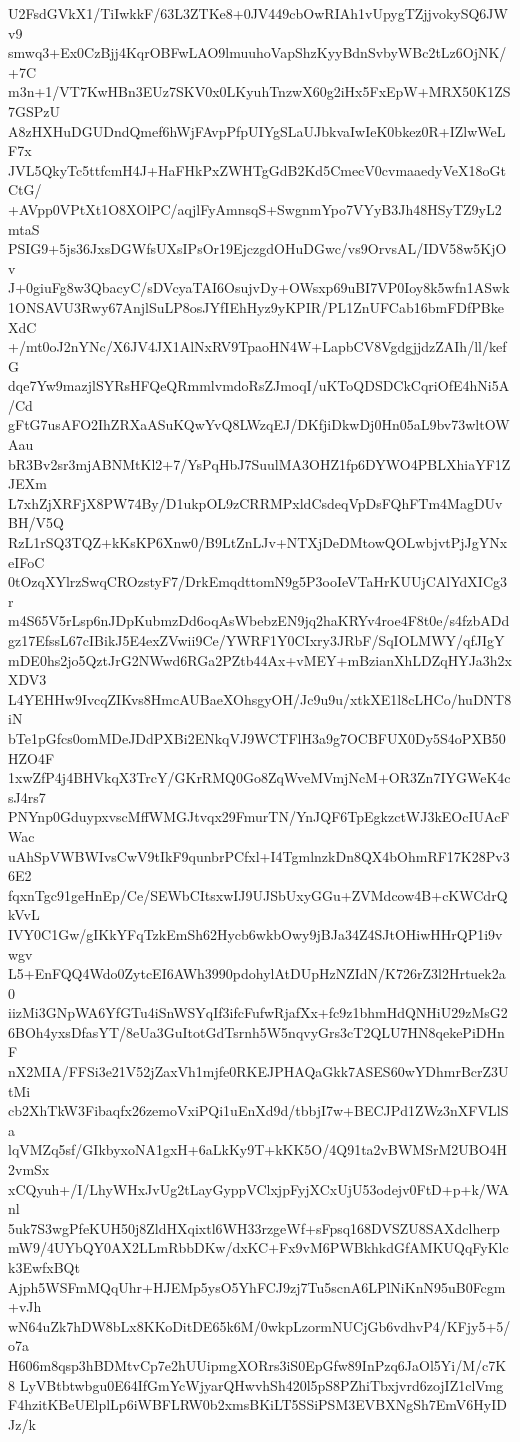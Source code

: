 U2FsdGVkX1/TiIwkkF/63L3ZTKe8+0JV449cbOwRIAh1vUpygTZjjvokySQ6JWv9
smwq3+Ex0CzBjj4KqrOBFwLAO9lmuuhoVapShzKyyBdnSvbyWBc2tLz6OjNK/+7C
m3n+1/VT7KwHBn3EUz7SKV0x0LKyuhTnzwX60g2iHx5FxEpW+MRX50K1ZS7GSPzU
A8zHXHuDGUDndQmef6hWjFAvpPfpUIYgSLaUJbkvaIwIeK0bkez0R+IZlwWeLF7x
JVL5QkyTc5ttfcmH4J+HaFHkPxZWHTgGdB2Kd5CmecV0cvmaaedyVeX18oGtCtG/
+AVpp0VPtXt1O8XOlPC/aqjlFyAmnsqS+SwgnmYpo7VYyB3Jh48HSyTZ9yL2mtaS
PSIG9+5js36JxsDGWfsUXsIPsOr19EjczgdOHuDGwc/vs9OrvsAL/IDV58w5KjOv
J+0giuFg8w3QbacyC/sDVcyaTAI6OsujvDy+OWsxp69uBI7VP0Ioy8k5wfn1ASwk
1ONSAVU3Rwy67AnjlSuLP8osJYfIEhHyz9yKPIR/PL1ZnUFCab16bmFDfPBkeXdC
+/mt0oJ2nYNc/X6JV4JX1AlNxRV9TpaoHN4W+LapbCV8VgdgjjdzZAIh/ll/kefG
dqe7Yw9mazjlSYRsHFQeQRmmlvmdoRsZJmoqI/uKToQDSDCkCqriOfE4hNi5A/Cd
gFtG7usAFO2IhZRXaASuKQwYvQ8LWzqEJ/DKfjiDkwDj0Hn05aL9bv73wltOWAau
bR3Bv2sr3mjABNMtKl2+7/YsPqHbJ7SuulMA3OHZ1fp6DYWO4PBLXhiaYF1ZJEXm
L7xhZjXRFjX8PW74By/D1ukpOL9zCRRMPxldCsdeqVpDsFQhFTm4MagDUvBH/V5Q
RzL1rSQ3TQZ+kKsKP6Xnw0/B9LtZnLJv+NTXjDeDMtowQOLwbjvtPjJgYNxeIFoC
0tOzqXYlrzSwqCROzstyF7/DrkEmqdttomN9g5P3ooIeVTaHrKUUjCAlYdXICg3r
m4S65V5rLsp6nJDpKubmzDd6oqAsWbebzEN9jq2haKRYv4roe4F8t0e/s4fzbADd
gz17EfssL67cIBikJ5E4exZVwii9Ce/YWRF1Y0CIxry3JRbF/SqIOLMWY/qfJIgY
mDE0hs2jo5QztJrG2NWwd6RGa2PZtb44Ax+vMEY+mBzianXhLDZqHYJa3h2xXDV3
L4YEHHw9IvcqZIKvs8HmcAUBaeXOhsgyOH/Jc9u9u/xtkXE1l8cLHCo/huDNT8iN
bTe1pGfcs0omMDeJDdPXBi2ENkqVJ9WCTFlH3a9g7OCBFUX0Dy5S4oPXB50HZO4F
1xwZfP4j4BHVkqX3TrcY/GKrRMQ0Go8ZqWveMVmjNcM+OR3Zn7IYGWeK4csJ4rs7
PNYnp0GduypxvscMffWMGJtvqx29FmurTN/YnJQF6TpEgkzctWJ3kEOcIUAcFWac
uAhSpVWBWIvsCwV9tIkF9qunbrPCfxl+I4TgmlnzkDn8QX4bOhmRF17K28Pv36E2
fqxnTgc91geHnEp/Ce/SEWbCItsxwIJ9UJSbUxyGGu+ZVMdcow4B+cKWCdrQkVvL
IVY0C1Gw/gIKkYFqTzkEmSh62Hycb6wkbOwy9jBJa34Z4SJtOHiwHHrQP1i9vwgv
L5+EnFQQ4Wdo0ZytcEI6AWh3990pdohylAtDUpHzNZIdN/K726rZ3l2Hrtuek2a0
iizMi3GNpWA6YfGTu4iSnWSYqIf3ifcFufwRjafXx+fc9z1bhmHdQNHiU29zMsG2
6BOh4yxsDfasYT/8eUa3GuItotGdTsrnh5W5nqvyGrs3cT2QLU7HN8qekePiDHnF
nX2MIA/FFSi3e21V52jZaxVh1mjfe0RKEJPHAQaGkk7ASES60wYDhmrBcrZ3UtMi
cb2XhTkW3Fibaqfx26zemoVxiPQi1uEnXd9d/tbbjI7w+BECJPd1ZWz3nXFVLlSa
lqVMZq5sf/GIkbyxoNA1gxH+6aLkKy9T+kKK5O/4Q91ta2vBWMSrM2UBO4H2vmSx
xCQyuh+/I/LhyWHxJvUg2tLayGyppVClxjpFyjXCxUjU53odejv0FtD+p+k/WAnl
5uk7S3wgPfeKUH50j8ZldHXqixtl6WH33rzgeWf+sFpsq168DVSZU8SAXdclherp
mW9/4UYbQY0AX2LLmRbbDKw/dxKC+Fx9vM6PWBkhkdGfAMKUQqFyKlck3EwfxBQt
Ajph5WSFmMQqUhr+HJEMp5ysO5YhFCJ9zj7Tu5scnA6LPlNiKnN95uB0Fcgm+vJh
wN64uZk7hDW8bLx8KKoDitDE65k6M/0wkpLzormNUCjGb6vdhvP4/KFjy5+5/o7a
H606m8qsp3hBDMtvCp7e2hUUipmgXORrs3iS0EpGfw89InPzq6JaOl5Yi/M/c7K8
LyVBtbtwbgu0E64IfGmYcWjyarQHwvhSh420l5pS8PZhiTbxjvrd6zojIZ1clVmg
F4hzitKBeUElplLp6iWBFLRW0b2xmsBKiLT5SSiPSM3EVBXNgSh7EmV6HyIDJz/k
